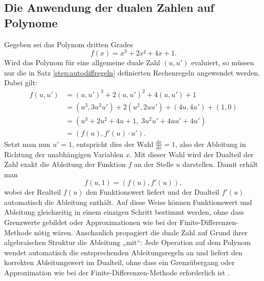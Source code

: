 \subsection{Die Anwendung der dualen Zahlen auf Polynome}
Gegeben sei das Polynom dritten Grades
\begin{equation*}
	f\left(x\right) =  x^3 + 2x² + 4x + 1.
\end{equation*}
Wird das Polynom für eine allgemeine duale Zahl $(u, u')$ evaluiert, so müssen nur die in Satz \ref{step:autodiffregeln} definierten Rechenregeln angewendet werden. Dabei gilt:
\begin{align*}
	f(u, u') &= (u, u')^3 + 2 (u, u')^2 + 4 (u, u') + 1 \\
	&= (u^3, 3 u^2 u') + 2 (u^2, 2 u u') + (4 u, 4 u') + (1, 0) \\
	&= (u^3 + 2 u^2 + 4 u + 1, \; 3 u^2 u' + 4 u u' + 4 u') \\
	&= (f(u), f'(u) \cdot u').
\end{align*}
Setzt man nun $u' = 1$, entspricht dies der Wahl $\frac{dx}{dx} = 1$, also der Ableitung in Richtung der unabhängigen Variablen $x$. Mit dieser Wahl wird der Dualteil der Zahl exakt die Ableitung der Funktion $f$ an der Stelle $u$ darstellen.
Damit erhält man
\begin{equation*}
	f(u, 1) = (f(u), f'(u)),
\end{equation*}
wobei der Realteil $f(u)$ den Funktionswert liefert und der Dualteil $f'(u)$ automatisch die Ableitung enthält.  
%
%
Auf diese Weise können Funktionswert und Ableitung gleichzeitig in einem einzigen Schritt bestimmt werden, ohne dass Grenzwerte gebildet oder Approximationen wie bei der Finite-Differenzen-Methode nötig wären. Anschaulich propagiert die duale Zahl auf Grund ihrer algebraischen Struktur die Ableitung „mit“: Jede Operation auf dem Polynom wendet automatisch die entsprechenden Ableitungsregeln an und liefert den korrekten Ableitungswert im Dualteil, ohne dass ein Grenzübergang oder Approximation wie bei der Finite-Differenzen-Methode erforderlich ist \cite{step:baydin2018}.

